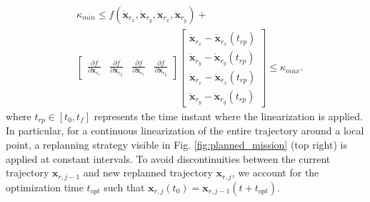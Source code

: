 \begin{enumerate}


    \begin{equation}
    \begin{split}
        & \kappa_{min} \leq 
f(\dot{\mathbf{x}}_{r_x}, \dot{\mathbf{x}}_{r_y}, \ddot{\mathbf{x}}_{r_x}, \ddot{\mathbf{x}}_{r_y}) + \\
        &\begin{bmatrix} 
            \frac{\partial f}{\partial  \dot{\mathbf{x}}_{r_x}} &  \frac{\partial f}{\partial  \dot{\mathbf{x}}_{r_y}} & 
            \frac{\partial f}{\partial  \ddot{\mathbf{x}}_{r_x}} & \frac{\partial f}{\partial  \ddot{\mathbf{x}}_{r_y}}
        \end{bmatrix}
        \begin{bmatrix} 
            \dot{\mathbf{x}}_{r_x} - \dot{\mathbf{x}}_{r_x}(t_{rp}) \\\dot{\mathbf{x}}_{r_y} - \dot{\mathbf{x}}_{r_y}(t_{rp}) \\ \ddot{\mathbf{x}}_{r_x} - \ddot{\mathbf{x}}_{r_x}(t_{rp})  \\ \ddot{\mathbf{x}}_{r_y} - \ddot{\mathbf{x}}_{r_y}(t_{rp}) 
        \end{bmatrix} 
        \leq \kappa_{max}.
    \end{split}
    \label{eq:curvature}
    \end{equation}
    where $t_{rp} \in [t_0, t_f]$ represents the time instant where the linearization is applied.
    In particular, for a continuous linearization of the entire trajectory around a local point, a replanning strategy visible in Fig. \ref{fig:planned_mission} (top right) is applied at constant intervals. To avoid discontinuities between the current trajectory $\mathbf{x}_{r, j-1}$ and new replanned trajectory $\mathbf{x}_{r, j}$, we account for the optimization time $t_{opt}$ such that $\mathbf{x}_{r, j}(t_0) = \mathbf{x}_{r, j-1}(t + t_{opt})$.
    
   
    
\end{enumerate}



